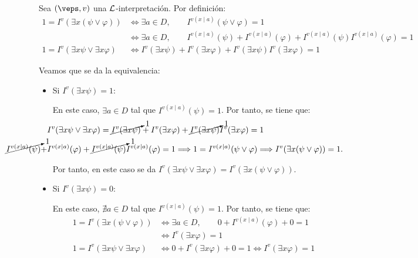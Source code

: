 \begin{ejercicio}
\begin{enumerate}
        Sea $(\veps,v)$ una $\mathcal{L}$-interpretación. Por definición:
        \begin{align*}
            1 = I^v(\exists x(\psi \vee \varphi))
            &\iff \exists a\in D,\qquad I^{v(x\mid a)}(\psi \vee \varphi) = 1\\
            &\iff \exists a\in D,\qquad I^{v(x\mid a)}(\psi) + I^{v(x\mid a)}(\varphi) + I^{v(x\mid a)}(\psi)I^{v(x\mid a)}(\varphi) = 1\\
            1 = I^v(\exists x \psi \vee \exists x \varphi)
            &\iff I^v(\exists x \psi) + I^v(\exists x \varphi) + I^v(\exists x \psi)I^v(\exists x \varphi) = 1
        \end{align*}

        Veamos que se da la equivalencia:
        \begin{itemize}
            \item Si $I^v(\exists x \psi)=1$:
            
            En este caso, $\exists a\in D$ tal que $I^{v(x\mid a)}(\psi) = 1$. Por tanto, se tiene que:
            \begin{align*}
                \hspace{-2cm}&I^v(\exists x \psi \vee \exists x \varphi) = \cancelto{1}{I^v(\exists x \psi)} + I^v(\exists x \varphi) + \cancelto{1}{I^v(\exists x \psi)}I^v(\exists x \varphi) = 1\\
                \hspace{-2cm}\cancelto{1}{I^{v(x\mid a)}(\psi)} +& I^{v(x\mid a)}(\varphi) + \cancelto{1}{I^{v(x\mid a)}(\psi)}I^{v(x\mid a)}(\varphi)=1
                \Longrightarrow 1 = I^{v(x\mid a)}(\psi \vee \varphi)
                \Longrightarrow I^v(\exists x(\psi \vee \varphi)) = 1.
            \end{align*}

            Por tanto, en este caso se da $I^v(\exists x \psi \vee \exists x \varphi) = I^v(\exists x(\psi \vee \varphi))$.

            \item Si $I^v(\exists x \psi)=0$:
            
            En este caso, $\nexists a\in D$ tal que $I^{v(x\mid a)}(\psi) = 1$. Por tanto, se tiene que:
            \begin{align*}
                1 = I^v(\exists x(\psi \vee \varphi))
                &\iff \exists a\in D,\qquad 0+ I^{v(x\mid a)}(\varphi) + 0 = 1\\
                &\iff I^v(\exists x \varphi) = 1\\
                1 = I^v(\exists x \psi \vee \exists x \varphi)
                &\iff 0 + I^v(\exists x \varphi) + 0 = 1\iff I^v(\exists x \varphi) = 1
            \end{align*}


\end{itemize}
\end{enumerate}
\end{ejercicio}
